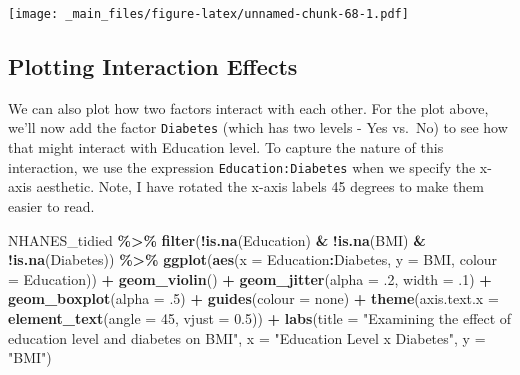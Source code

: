 \documentclass[
]{book}
\newenvironment{Shaded}{\begin{snugshade}}{\end{snugshade}}
\newcommand{\AttributeTok}[1]{\textcolor[rgb]{0.13,0.29,0.53}{#1}}
\newcommand{\DecValTok}[1]{\textcolor[rgb]{0.00,0.00,0.81}{#1}}
\newcommand{\FloatTok}[1]{\textcolor[rgb]{0.00,0.00,0.81}{#1}}
\newcommand{\FunctionTok}[1]{\textcolor[rgb]{0.13,0.29,0.53}{\textbf{#1}}}
\newcommand{\NormalTok}[1]{#1}
\newcommand{\SpecialCharTok}[1]{\textcolor[rgb]{0.81,0.36,0.00}{\textbf{#1}}}
\newcommand{\StringTok}[1]{\textcolor[rgb]{0.31,0.60,0.02}{#1}}
\begin{document}
\texttt{[image: \_main\_files/figure-latex/unnamed-chunk-68-1.pdf]}

\hypertarget{plotting-interaction-effects}{%
\subsection{Plotting Interaction Effects}\label{plotting-interaction-effects}}

We can also plot how two factors interact with each other. For the plot above, we'll now add the factor \texttt{Diabetes} (which has two levels - Yes vs.~No) to see how that might interact with Education level. To capture the nature of this interaction, we use the expression \texttt{Education:Diabetes} when we specify the x-axis aesthetic. Note, I have rotated the x-axis labels 45 degrees to make them easier to read.

\begin{Shaded}
\begin{Highlighting}[]
\NormalTok{NHANES\_tidied }\SpecialCharTok{\%\textgreater{}\%} 
  \FunctionTok{filter}\NormalTok{(}\SpecialCharTok{!}\FunctionTok{is.na}\NormalTok{(Education) }\SpecialCharTok{\&} \SpecialCharTok{!}\FunctionTok{is.na}\NormalTok{(BMI) }\SpecialCharTok{\&} \SpecialCharTok{!}\FunctionTok{is.na}\NormalTok{(Diabetes)) }\SpecialCharTok{\%\textgreater{}\%}
  \FunctionTok{ggplot}\NormalTok{(}\FunctionTok{aes}\NormalTok{(}\AttributeTok{x =}\NormalTok{ Education}\SpecialCharTok{:}\NormalTok{Diabetes, }\AttributeTok{y =}\NormalTok{ BMI, }\AttributeTok{colour =}\NormalTok{ Education)) }\SpecialCharTok{+} 
  \FunctionTok{geom\_violin}\NormalTok{() }\SpecialCharTok{+}
  \FunctionTok{geom\_jitter}\NormalTok{(}\AttributeTok{alpha =}\NormalTok{ .}\DecValTok{2}\NormalTok{, }\AttributeTok{width =}\NormalTok{ .}\DecValTok{1}\NormalTok{) }\SpecialCharTok{+}
  \FunctionTok{geom\_boxplot}\NormalTok{(}\AttributeTok{alpha =}\NormalTok{ .}\DecValTok{5}\NormalTok{) }\SpecialCharTok{+}
  \FunctionTok{guides}\NormalTok{(}\AttributeTok{colour =} \StringTok{\textquotesingle{}none\textquotesingle{}}\NormalTok{) }\SpecialCharTok{+} 
  \FunctionTok{theme}\NormalTok{(}\AttributeTok{axis.text.x =} \FunctionTok{element\_text}\NormalTok{(}\AttributeTok{angle =} \DecValTok{45}\NormalTok{, }\AttributeTok{vjust =} \FloatTok{0.5}\NormalTok{)) }\SpecialCharTok{+}
  \FunctionTok{labs}\NormalTok{(}\AttributeTok{title =} \StringTok{"Examining the effect of education level and diabetes on BMI"}\NormalTok{, }
       \AttributeTok{x =} \StringTok{"Education Level x Diabetes"}\NormalTok{, }
       \AttributeTok{y =} \StringTok{"BMI"}\NormalTok{)}
\end{Highlighting}
\end{Shaded}
\end{document}
